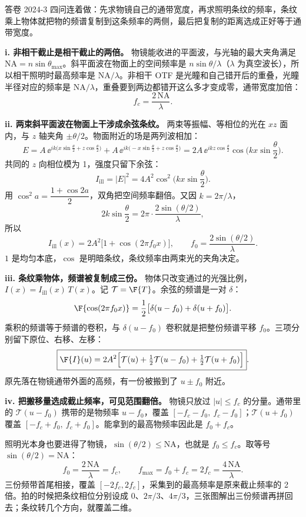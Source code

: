 \begin{exam}{答卷 2024-3}
四问连着做：先求物镜自己的通带宽度，再求照明条纹的频率，条纹乘上物体就把物的频谱复制到这条频率的两侧，最后把复制的距离选成正好等于通带宽度。

\textbf{i. 非相干截止是相干截止的两倍。}
物镜能收进的平面波，与光轴的最大夹角满足 $\mathrm{NA}=n\sin\theta_{\max}$。斜平面波在物面上的空间频率是 $n\sin\theta/\lambda$（$\lambda$ 为真空波长），所以相干照明时最高频率是 $\mathrm{NA}/\lambda$。非相干 OTF 是光瞳和自己错开后的重叠，光瞳半径对应的频率是 $\mathrm{NA}/\lambda$，重叠要到两边都错开这么多才变成零，通带宽度加倍：
\[
\boxed{f_c=\frac{2\,\mathrm{NA}}{\lambda}} .
\]

\textbf{ii. 两束斜平面波在物面上干涉成余弦条纹。}
两束等振幅、等相位的光在 $xz$ 面内，与 $z$ 轴夹角 $\pm\theta/2$。物面附近的场是两列波相加：
\[
E=A\,\ee^{ik\bigl(x\sin\frac\theta2+z\cos\frac\theta2\bigr)}
+A\,\ee^{ik\bigl(-x\sin\frac\theta2+z\cos\frac\theta2\bigr)}
=2A\,\ee^{ikz\cos\frac\theta2}\cos\!\Big(kx\sin\frac\theta2\Big).
\]
共同的 $z$ 向相位模为 1，强度只留下余弦：
\[
I_{\text{ill}}=|E|^2=4A^2\cos^2\!\Big(kx\sin\frac\theta2\Big).
\]
用 $\cos^2 a=\dfrac{1+\cos 2a}{2}$，双角把空间频率翻倍。又因 $k=2\pi/\lambda$，
\[
2k\sin\frac\theta2=2\pi\cdot\frac{2\sin(\theta/2)}{\lambda},
\]
所以
\[
I_{\text{ill}}(x)=2A^2\big[1+\cos(2\pi f_0 x)\big],\qquad
\boxed{f_0=\frac{2\sin(\theta/2)}{\lambda}} .
\]
$1$ 是均匀本底，$\cos$ 是明暗条纹，条纹频率由两束光的夹角决定。

\textbf{iii. 条纹乘物体，频谱被复制成三份。}
物体只改变通过的光强比例，$I(x)=I_{\text{ill}}(x)\,T(x)$。记 $\mathcal T=\F\{T\}$。余弦的频谱是一对 $\delta$：
\[
\F\{\cos(2\pi f_0 x)\}=\frac12\bigl[\delta(u-f_0)+\delta(u+f_0)\bigr].
\]
乘积的频谱等于频谱的卷积，与 $\delta(u-f_0)$ 卷积就是把整份频谱平移 $f_0$。三项分别留下原位、右移、左移：
\[
\boxed{\F\{I\}(u)=2A^2\Big[\mathcal T(u)+\tfrac12\mathcal T(u-f_0)+\tfrac12\mathcal T(u+f_0)\Big]} .
\]
原先落在物镜通带外面的高频，有一份被搬到了 $u\pm f_0$ 附近。

\textbf{iv. 把搬移量选成截止频率，可见范围翻倍。}
物镜只放过 $|u|\le f_c$ 的分量。通带里的 $\mathcal T(u-f_0)$ 携带的是物频率 $u-f_0$，覆盖 $[-f_c-f_0,\ f_c-f_0]$；$\mathcal T(u+f_0)$ 覆盖 $[-f_c+f_0,\ f_c+f_0]$。能拿到的最高物频率因此是 $f_0+f_c$。

照明光本身也要进得了物镜，$\sin(\theta/2)\le\mathrm{NA}$，也就是 $f_0\le f_c$。取等号 $\sin(\theta/2)=\mathrm{NA}$：
\[
f_0=\frac{2\,\mathrm{NA}}{\lambda}=f_c,\qquad f_{\max}=f_0+f_c=2f_c=\frac{4\,\mathrm{NA}}{\lambda}.
\]
三份频带首尾相接，覆盖 $[-2f_c,2f_c]$，采集到的最高频率是原来截止频率的 2 倍。拍的时候把条纹相位分别设成 $0$、$2\pi/3$、$4\pi/3$，三张图解出三份频谱再拼回去；条纹转几个方向，就覆盖二维。
\end{exam}

